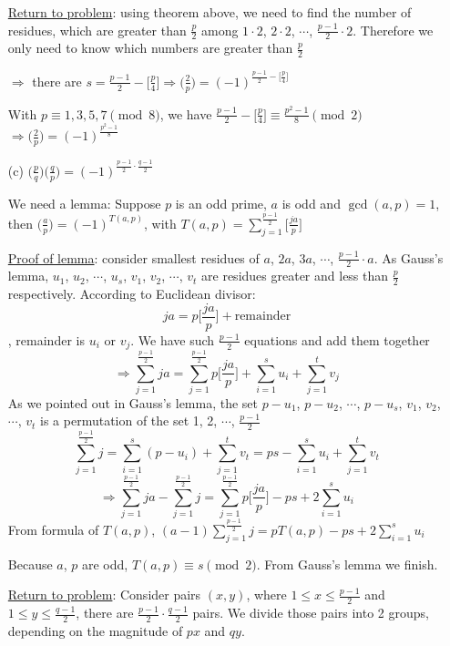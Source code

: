 \begin{exer}[3.38]
\begin{enumerate}
		\underline{Return to problem}: using theorem above, we need to find the number of residues, which are greater than $\frac{p}{2}$ among $1 \cdot 2$, $2 \cdot 2$, $\cdots$, $\frac{p-1}{2} \cdot 2$. Therefore we only need to know which numbers are greater than $\frac{p}{2}$
		
		$\Rightarrow$ there are $s = \frac{p-1}{2} - \Big[\frac{p}{4}\Big] \Rightarrow \Big(\frac{2}{p}\Big) = (-1)^{\frac{p-1}{2} - \Big[\frac{p}{4}\Big] }$
		
		With $p \equiv 1, 3, 5, 7 \pmod 8$, we have $\frac{p-1}{2} - \Big[\frac{p}{4}\Big] \equiv \frac{p^2-1}{8} \pmod 2$ \\ $\Rightarrow \Big(\frac{2}{p}\Big) = (-1)^{\frac{p^2-1}{8}}$
		\item [(c)] $\Big(\frac{p}{q}\Big)\Big(\frac{q}{p}\Big) = (-1)^{\frac{p-1}{2} \cdot \frac{q-1}{2}}$
		
		We need a lemma: Suppose $p$ is an odd prime, $a$ is odd and $\gcd(a, p) = 1$, then $\Big(\frac{a}{p}\Big) = (-1)^{T(a, p)}$, with $T(a, p) = \sum_{j=1}^{\frac{p-1}{2}}\Big[\frac{ja}{p}\Big]$
		
		\underline{Proof of lemma}: consider smallest residues of $a$, $2a$, $3a$, $\cdots$, $\frac{p-1}{2} \cdot a$. As Gauss's lemma, $u_1$, $u_2$, $\cdots$, $u_s$, $v_1$, $v_2$, $\cdots$, $v_t$ are residues greater and less than $\frac{p}{2}$ respectively. According to Euclidean divisor: $$ja = p \Big[\frac{ja}{p}\Big] + \text{remainder}$$, remainder is $u_i$ or $v_j$. We have such $\frac{p-1}{2}$ equations and add them together $$\Rightarrow \sum_{j=1}^{\frac{p-1}{2}}ja = \sum_{j=1}^{\frac{p-1}{2}}p\Big[\frac{ja}{p}\Big] + \sum_{i=1}^{s}u_i + \sum_{j=1}^{t}v_j$$
		As we pointed out in Gauss's lemma, the set $p-u_1$, $p-u_2$, $\cdots$, $p-u_s$, $v_1$, $v_2$, $\cdots$, $v_t$ is a permutation of the set 1, 2, $\cdots$, $\frac{p-1}{2}$
		$$\sum_{j=1}^{\frac{p-1}{2}}j = \sum_{i=1}^{s}(p-u_i) + \sum_{j=1}^{t}v_t = ps - \sum_{i=1}^{s}u_i + \sum_{j=1}^{t}v_t$$
		$$\Rightarrow \sum_{j=1}^{\frac{p-1}{2}}ja - \sum_{j=1}^{\frac{p-1}{2}}j = \sum_{j=1}^{\frac{p-1}{2}}p\Big[\frac{ja}{p}\Big] - ps + 2\sum_{i=1}^{s}u_i$$
		From formula of $T(a, p)$, $(a-1)\sum_{j=1}^{\frac{p-1}{2}}j = pT(a, p) - ps + 2 \sum_{i=1}^{s}u_i$
		
		Because $a$, $p$ are odd, $T(a, p) \equiv s \pmod 2$. From Gauss's lemma we finish.
		
		\underline{Return to problem}: Consider pairs $(x, y)$, where $1 \leq x \leq \frac{p-1}{2}$ and $1 \leq y \leq \frac{q-1}{2}$, there are $\frac{p-1}{2}\cdot\frac{q-1}{2}$ pairs. We divide those pairs into 2 groups, depending on the magnitude of $px$ and $qy$.
		

\end{enumerate}
\end{exer}
